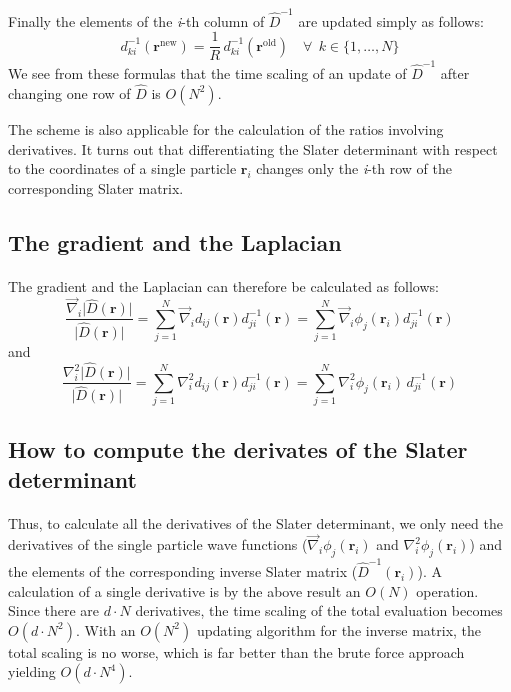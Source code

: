 \documentclass[%
twoside,                 %
final,                   %
10pt]{article}
\begin{document}
Finally the elements of the \emph{i}-th column of $\hat{D}^{-1}$ are updated
simply as follows:
\begin{equation}
d_{ki}^{-1}(\mathbf{r}^{\mathrm{new}}) =
\frac{1}{R}\,d_{ki}^{-1}(\mathbf{r}^{\mathrm{old}})\quad
\forall\ \ k\in\{1,\dots,N\}
\label{eq:inverse_update_3}
\end{equation}
We see from these formulas that the time scaling of an update of
$\hat{D}^{-1}$ after changing one row of $\hat{D}$ is $O(N^2)$.


The scheme is also applicable for the calculation of the ratios
involving derivatives. It turns
out that differentiating the Slater determinant with respect
to the coordinates of a single particle  $\mathbf{r}_i$ changes only the
\emph{i}-th row of the corresponding Slater matrix.




\subsection*{The gradient and the Laplacian}

\paragraph{}
The gradient and the Laplacian can therefore be calculated as follows:
\[
\frac{\vec\nabla_i\vert\hat{D}(\mathbf{r})\vert}{\vert\hat{D}(\mathbf{r})\vert} =
\sum_{j=1}^N \vec\nabla_i d_{ij}(\mathbf{r})d_{ji}^{-1}(\mathbf{r}) =
\sum_{j=1}^N \vec\nabla_i \phi_j(\mathbf{r}_i)d_{ji}^{-1}(\mathbf{r})
\]
and
\[
\frac{\nabla^2_i\vert\hat{D}(\mathbf{r})\vert}{\vert\hat{D}(\mathbf{r})\vert} =
\sum_{j=1}^N \nabla^2_i d_{ij}(\mathbf{r})d_{ji}^{-1}(\mathbf{r}) =
\sum_{j=1}^N \nabla^2_i \phi_j(\mathbf{r}_i)\,d_{ji}^{-1}(\mathbf{r})
\]



\subsection*{How to compute the derivates of the Slater determinant}

\paragraph{}

Thus, to calculate all the derivatives of the Slater determinant, we
only need the derivatives of the single particle  wave functions
($\vec\nabla_i \phi_j(\mathbf{r}_i)$ and $\nabla^2_i \phi_j(\mathbf{r}_i)$)
and the elements of the corresponding inverse Slater matrix ($\hat{D}^{-1}(\mathbf{r}_i)$). A calculation of a single derivative is by the
above result an $O(N)$ operation. Since there are $d\cdot N$
derivatives, the time scaling of the total evaluation becomes
$O(d\cdot N^2)$. With an $O(N^2)$ updating algorithm for the
inverse matrix, the total scaling is no worse, which is far better
than the brute force approach yielding $O(d\cdot N^4)$.
\end{document}
